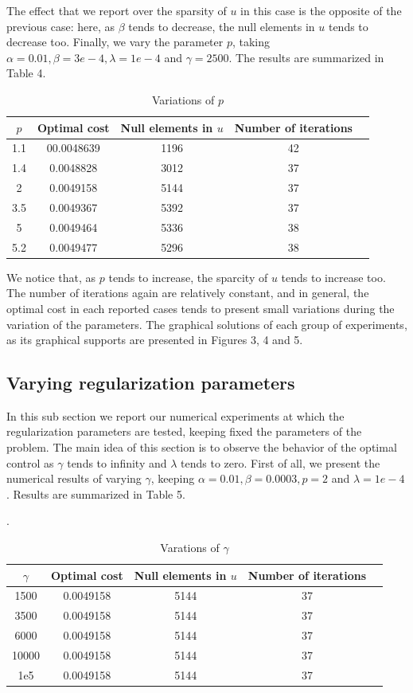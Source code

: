 \documentclass[11pt,a4paper]{amsart}
\begin{document}
The effect that we report over the sparsity of $u$ in this case is the opposite of the previous case: here, as $\beta$ tends to decrease, the null elements in $u$ tends to decrease too. Finally, we vary the parameter $p$, taking $\alpha=0.01, \beta=3e-4, \lambda=1e-4$ and $\gamma=2500$. The results are summarized in Table 4.
\begin{table}[h]
    \centering
    \begin{tabular}{|c|c|c|c|c|}
    \hline
    $p$ & Optimal cost & Null elements in $u$ & Number of iterations\\
    \hline
    1.1&00.0048639&1196&42\\
    1.4&0.0048828&3012&37\\
    2&0.0049158&5144&37\\
    3.5  & 0.0049367 &5392  & 37  \\
    5&0.0049464&5336&38\\
    5.2&0.0049477&5296&38\\   
    \hline
    \end{tabular}
    \caption{Variations of $p$}
\end{table}

We notice that, as $p$ tends to increase, the sparcity of $u$ tends to increase too. The number of iterations again are relatively constant, and in general, the optimal cost in each reported cases tends to present small variations during the variation of the parameters. The graphical solutions of each group of experiments, as its graphical supports are presented in Figures 3, 4 and 5.\\

\subsection{Varying regularization parameters}
In this sub section we report our numerical experiments at which the regularization parameters are tested, keeping fixed the parameters of the problem. The main idea of this section is to observe the behavior of the optimal control as $\gamma$ tends to infinity and $\lambda$ tends to zero. First of all, we present the numerical results of varying $\gamma$, keeping $\alpha=0.01, \beta=0.0003, p=2$ and $\lambda=1e-4$.  Results are summarized in Table 5.  
\begin{table}[h].
    \centering
    \begin{tabular}{|c|c|c|c|c|}
    \hline
    $\gamma$ & Optimal cost & Null elements in $u$ & Number of iterations\\
    \hline
    1500&0.0049158&5144&37\\
    3500&0.0049158&5144&37\\
    6000&0.0049158&5144&37\\
    10000  & 0.0049158 &5144  & 37  \\
    1e5&0.0049158&5144&37\\ 
    \hline
    \end{tabular}
    \caption{Varations of $\gamma$}
\end{table}
\end{document}
